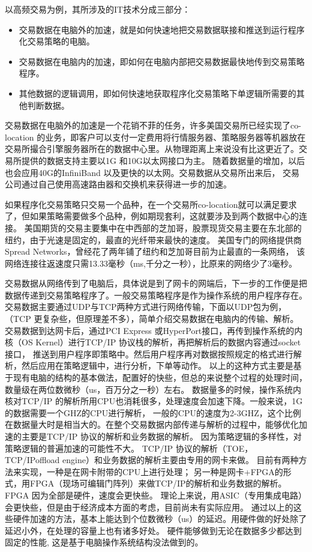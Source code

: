 以高频交易为例，其所涉及的IT技术分成三部分：
\begin{itemize}
\item 交易数据在电脑外的加速，就是如何快速地把交易数据联接和推送到运行程序化交易策略的电脑。
\item 交易数据在电脑内的加速，即如何在电脑内部把交易数据最快地传到交易策略程序。
\item 其他数据的逻辑调用，即如何快速地获取程序化交易策略下单逻辑所需要的其他判断数据。
\end{itemize}	 
交易数据在电脑外的加速是一个花销不菲的任务，许多美国交易所已经实现了co-location 的业务，即客户可以支付一定费用将行情服务器、策略服务器等机器放在
交易所撮合引擎服务器所在的数据中心里。从物理距离上来说没有比这更近了。交易所提供的数据支持主要以1G 和10G以太网接口为主。
随着数据量的增加，以后也会应用40G的InfiniBand 以及更快的以太网。交易数据从交易所出来后，
交易公司通过自己使用高速路由器和交换机来获得进一步的加速。
	  
如果程序化交易策略只交易一个品种，在一个交易所co-location就可以满足要求了，但如果策略需要做多个品种，例如期现套利，这就要涉及到两个数据中心的连接。
美国期货的交易主要集中在中西部的芝加哥，股票现货交易主要在东北部的纽约，由于光速是固定的，最直的光纤带来最快的速度。
美国专门的网络提供商Spread Networks，曾经花了两年铺了纽约和芝加哥目前为止最直的一条网络，
该网络连接往返速度只需13.33毫秒（ms,千分之一秒），比原来的网络少了3毫秒。
	   
交易数据从网络传到了电脑后，具体说是到了网卡的网端后，下一步的工作便是把数据传递到交易策略程序了。一般交易策略程序是作为操作系统的用户程序存在。
交易数据主要通过UDP与TCP两种方式进行网络传输，下面以UDP包为例，（TCP 更复杂些，但原理差不多），简单介绍交易数据在电脑内的传输、解析。
交易数据到达网卡后，通过PCI Express 或HyperPort接口，再传到操作系统的内核（OS Kernel）进行TCP/IP 协议栈的解析，再把解析后的数据内容通过socket 接口，
推送到用户程序即策略中。然后用户程序再对数据按照规定的格式进行解析，然后应用在策略逻辑中，进行分析，下单等动作。
以上的这种方式主要是基于现有电脑的结构的基本做法，配置好的快些，但总的来说整个过程的处理时间，数量级在两位数微秒（us，百万分之一秒）左右。
数据量多的时候，操作系统内核对TCP/IP 的解析所用CPU也消耗很多，处理速度会加速下降。一般来说，1G 的数据需要一个GHZ的CPU进行解析，
一般的CPU的速度为2-3GHZ，这个比例在数据量大时是相当大的。在整个交易数据内部传递与解析的过程中，能够优化加速的主要是TCP/IP 协议的解析和业务数据的解析。
因为策略逻辑的多样性，对策略逻辑的普遍加速的可能性不大。 TCP/IP 协议的解析（TOE，TCP/IPoffload engine）和业务数据的解析主要由专用的网卡来做。
目前有两种方法来实现，一种是在网卡附带的CPU上进行处理；
另一种是网卡+FPGA的形式，用FPGA（现场可编辑门阵列）来做TCP/IP的解析和业务数据的解析。 FPGA 因为全部是硬件，速度会更快些。
理论上来说，用ASIC（专用集成电路）会更快些，但是由于经济成本方面的考虑，目前尚未有实际应用。 
通过以上的这些硬件加速的方法，基本上能达到个位数微秒（us）的延迟。用硬件做的好处除了延迟小外，在处理的容量上也有诸多好处。
硬件能够做到无论在数据多少都达到固定的性能, 这是基于电脑操作系统结构没法做到的。
	    
